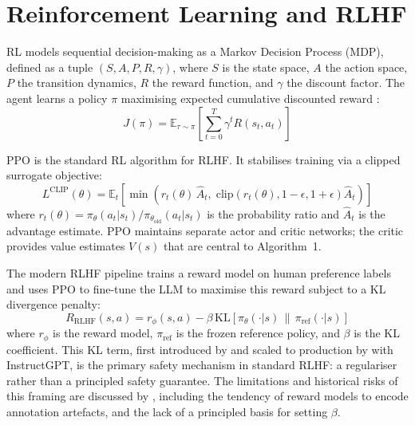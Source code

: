 \documentclass[a4paper,twoside,12pt]{report}
\begin{document}
\section{Reinforcement Learning and RLHF}

RL models sequential decision-making as a Markov Decision Process (MDP), defined as a tuple
$(S, A, P, R, \gamma)$, where $S$ is the state space, $A$ the action space, $P$ the
transition dynamics, $R$ the reward function, and $\gamma$ the discount factor. The agent
learns a policy $\pi$ maximising expected cumulative discounted reward
\citep{puterman2014, sutton2018}:
\begin{equation}
  J(\pi) = \mathbb{E}_{\tau \sim \pi}\!\left[\sum_{t=0}^{T} \gamma^t R(s_t, a_t)\right]
  \label{eq:rl_objective}
\end{equation}

PPO \citep{schulman2017} is the standard RL algorithm for RLHF. It stabilises training
via a clipped surrogate objective:
\begin{equation}
  L^{\text{CLIP}}(\theta) = \mathbb{E}_t\!\left[
    \min\!\left( r_t(\theta)\,\hat{A}_t,\;
    \mathrm{clip}(r_t(\theta), 1{-}\epsilon, 1{+}\epsilon)\hat{A}_t
    \right)
  \right]
  \label{eq:ppo_clip}
\end{equation}
where $r_t(\theta) = \pi_\theta(a_t|s_t)/\pi_{\theta_\text{old}}(a_t|s_t)$ is the
probability ratio and $\hat{A}_t$ is the advantage estimate. PPO maintains separate actor
and critic networks; the critic provides value estimates $V(s)$ that are central to
Algorithm~1.

The modern RLHF pipeline trains a reward model on human preference labels and uses PPO to
fine-tune the LLM to maximise this reward subject to a KL divergence penalty:
\begin{equation}
  R_{\text{RLHF}}(s,a) = r_\phi(s,a)
    - \beta\,\mathrm{KL}\!\left[\pi_\theta(\cdot|s)\,\|\,\pi_{\text{ref}}(\cdot|s)\right]
  \label{eq:rlhf_reward}
\end{equation}
where $r_\phi$ is the reward model, $\pi_\text{ref}$ is the frozen reference policy, and
$\beta$ is the KL coefficient. This KL term, first introduced by \citet{ziegler2019fine}
and scaled to production by \citet{ouyang2022training} with InstructGPT, is the primary
safety mechanism in standard RLHF: a regulariser rather than a principled safety
guarantee. The limitations and historical risks of this framing are discussed by
\citet{lambert2023entangled}, including the tendency of reward models to encode annotation
artefacts, and the lack of a principled basis for setting $\beta$.
\end{document}
